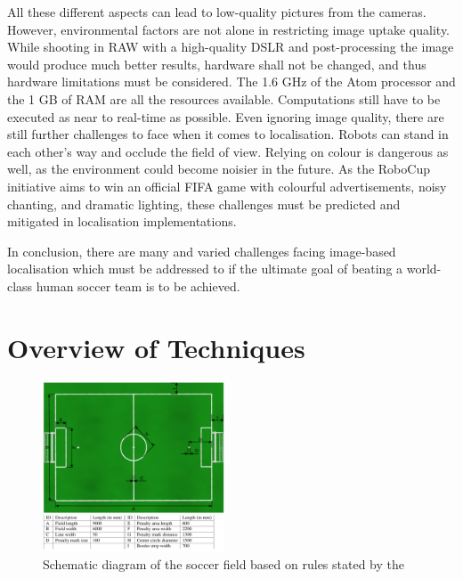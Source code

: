 \documentclass[12pt, a4paper, doc]{apa6}
\begin{document}
  All these different aspects can lead to low-quality pictures from the cameras. However, environmental factors are not alone in restricting image uptake quality. While shooting in RAW with a high-quality DSLR and post-processing the image would produce much better results, hardware shall not be changed, and thus hardware limitations must be considered. The 1.6 GHz of the Atom processor and the 1 GB of RAM are all the resources available. Computations still have to be executed as near to real-time as possible. Even ignoring image quality, there are still further challenges to face when it comes to localisation. Robots can stand in each other's way and occlude the field of view. Relying on colour is dangerous as well, as the environment could become noisier in the future. As the RoboCup initiative aims to win an official FIFA game with colourful advertisements, noisy chanting, and dramatic lighting, these challenges must be predicted and mitigated in localisation implementations.

  In conclusion, there are many and varied challenges facing image-based localisation which must be addressed to if the ultimate goal of beating a world-class human soccer team is to be achieved.

  \newpage

  \section{Overview of Techniques}

  \begin{figure}
    \begin{center}
      \includegraphics[width=0.48\textwidth]{field.png}
    \end{center}
    \caption{Schematic diagram of the soccer field based on rules stated by the \cite{soccerfield}}
    \label{field}
  \end{figure}
\end{document}
